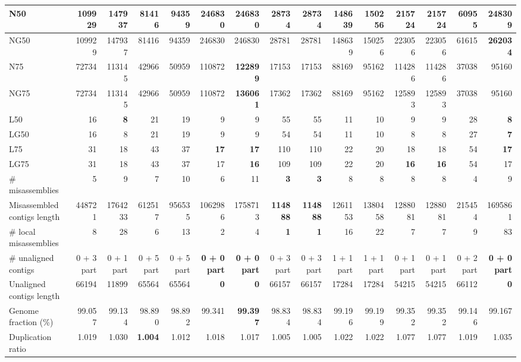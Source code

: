 \documentclass[12pt,a4paper]{article}
\begin{document}
\begin{table}[ht]
\begin{center}
\begin{tabular}{|l*{14}{|r}|}
N50 & 109929 & 147937 & 81416 & 94359 & 246830 & 246830 & 28734 & 28734 & 148639 & 150256 & 215724 & 215724 & 60955 & {\bf 248309} \\ \hline
NG50 & 109929 & 147937 & 81416 & 94359 & 246830 & 246830 & 28781 & 28781 & 148639 & 150256 & 223056 & 223056 & 61615 & {\bf 262034} \\ \hline
N75 & 72734 & 113145 & 42966 & 50959 & 110872 & {\bf 122899} & 17153 & 17153 & 88169 & 95162 & 114286 & 114286 & 37038 & 95160 \\ \hline
NG75 & 72734 & 113145 & 42966 & 50959 & 110872 & {\bf 136061} & 17362 & 17362 & 88169 & 95162 & 125893 & 125893 & 37038 & 95160 \\ \hline
L50 & 16 & {\bf 8} & 21 & 19 & 9 & 9 & 55 & 55 & 11 & 10 & 9 & 9 & 28 & {\bf 8} \\ \hline
LG50 & 16 & 8 & 21 & 19 & 9 & 9 & 54 & 54 & 11 & 10 & 8 & 8 & 27 & {\bf 7} \\ \hline
L75 & 31 & 18 & 43 & 37 & {\bf 17} & {\bf 17} & 110 & 110 & 22 & 20 & 18 & 18 & 54 & {\bf 17} \\ \hline
LG75 & 31 & 18 & 43 & 37 & 17 & {\bf 16} & 109 & 109 & 22 & 20 & {\bf 16} & {\bf 16} & 54 & 17 \\ \hline
\# misassemblies & 5 & 9 & 7 & 10 & 6 & 11 & {\bf 3} & {\bf 3} & 8 & 8 & 8 & 8 & 4 & 9 \\ \hline
Misassembled contigs length & 448721 & 1764233 & 612517 & 956535 & 1062986 & 1758713 & {\bf 114888} & {\bf 114888} & 1261153 & 1380458 & 1288081 & 1288081 & 215454 & 1695861 \\ \hline
\# local misassemblies & 8 & 28 & 6 & 13 & 2 & 4 & {\bf 1} & {\bf 1} & 16 & 22 & 7 & 7 & 9 & 83 \\ \hline
\# unaligned contigs & 0 + 3 part & 0 + 1 part & 0 + 5 part & 0 + 5 part & {\bf 0 + 0 part} & {\bf 0 + 0 part} & 0 + 3 part & 0 + 3 part & 1 + 1 part & 1 + 1 part & 0 + 1 part & 0 + 1 part & 0 + 2 part & {\bf 0 + 0 part} \\ \hline
Unaligned contigs length & 66194 & 11899 & 65564 & 65564 & {\bf 0} & {\bf 0} & 66157 & 66157 & 17284 & 17284 & 54215 & 54215 & 66112 & {\bf 0} \\ \hline
Genome fraction (\%) & 99.057 & 99.134 & 98.890 & 98.892 & 99.341 & {\bf 99.397} & 98.834 & 98.834 & 99.196 & 99.199 & 99.352 & 99.352 & 99.146 & 99.167 \\ \hline
Duplication ratio & 1.019 & 1.030 & {\bf 1.004} & 1.012 & 1.018 & 1.017 & 1.005 & 1.005 & 1.022 & 1.022 & 1.077 & 1.077 & 1.019 & 1.035 \\ \hline

\end{tabular}
\end{center}
\end{table}
\end{document}
